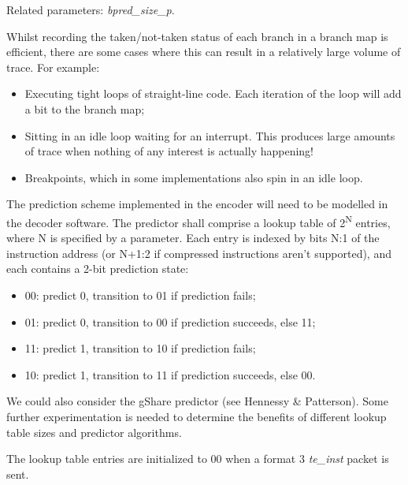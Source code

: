 Related parameters: \textit{bpred\_size\_p}.

Whilst recording the taken/not-taken status of each branch in a branch map is efficient, there are 
some cases where this can result in a relatively large volume of trace.  For example:

\begin{itemize}
  \item Executing tight loops of straight-line code.  Each iteration of the loop will add a bit to the branch map;
  \item Sitting in an idle loop waiting for an interrupt.  This produces large amounts of trace when nothing of 
  any interest is actually happening!  
  \item Breakpoints, which in some implementations also spin in an idle loop.
\end{itemize}

The prediction scheme implemented in the encoder will need to be modelled in the decoder software.  
The predictor shall comprise a lookup table of 2\textsuperscript{N} entries, where N is specified by a parameter.  
Each entry is indexed by bits N:1 of the instruction address (or N+1:2 if compressed instructions aren't supported), 
and each contains a 2-bit prediction state:
\begin{itemize}
  \item 00: predict 0, transition to 01 if prediction fails;
  \item 01: predict 0, transition to 00 if prediction succeeds, else 11;
  \item 11: predict 1, transition to 10 if prediction fails;
  \item 10: predict 1, transition to 11 if prediction succeeds, else 00.
\end{itemize}

We could also consider the gShare predictor (see Hennessy \& Patterson).  Some further experimentation is needed
to determine the benefits of different lookup table sizes and predictor algorithms.

The lookup table entries are initialized to 00 when a format 3 \textit{te\_inst} packet is sent.

